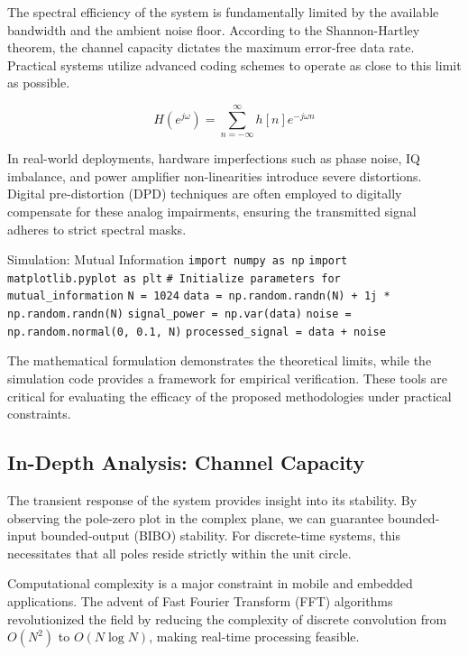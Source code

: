 The spectral efficiency of the system is fundamentally limited by the available bandwidth and the ambient noise floor. According to the Shannon-Hartley theorem, the channel capacity dictates the maximum error-free data rate. Practical systems utilize advanced coding schemes to operate as close to this limit as possible.

\begin{equation}
    H(e^{j\omega}) = \sum_{n=-\infty}^{\infty} h[n] e^{-j\omega n}
\end{equation}

In real-world deployments, hardware imperfections such as phase noise, IQ imbalance, and power amplifier non-linearities introduce severe distortions. Digital pre-distortion (DPD) techniques are often employed to digitally compensate for these analog impairments, ensuring the transmitted signal adheres to strict spectral masks.

\begin{pythonbox}{Simulation: Mutual Information}
\texttt{import numpy as np}
\texttt{import matplotlib.pyplot as plt}
\texttt{}
\texttt{\# Initialize parameters for mutual\_information}
\texttt{N = 1024}
\texttt{data = np.random.randn(N) + 1j * np.random.randn(N)}
\texttt{signal\_power = np.var(data)}
\texttt{noise = np.random.normal(0, 0.1, N)}
\texttt{processed\_signal = data + noise}
\end{pythonbox}

\vspace{0.5cm}
The mathematical formulation demonstrates the theoretical limits, while the simulation code provides a framework for empirical verification. These tools are critical for evaluating the efficacy of the proposed methodologies under practical constraints.


\subsection{In-Depth Analysis: Channel Capacity}
The transient response of the system provides insight into its stability. By observing the pole-zero plot in the complex plane, we can guarantee bounded-input bounded-output (BIBO) stability. For discrete-time systems, this necessitates that all poles reside strictly within the unit circle.

Computational complexity is a major constraint in mobile and embedded applications. The advent of Fast Fourier Transform (FFT) algorithms revolutionized the field by reducing the complexity of discrete convolution from $O(N^2)$ to $O(N \log N)$, making real-time processing feasible.

